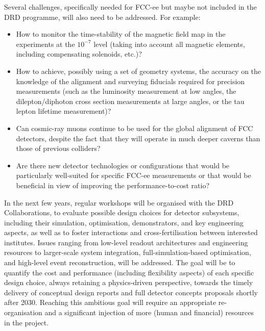 Several challenges, specifically needed for FCC-ee but maybe not included in the DRD programme, will also need to be addressed. 
For example:
\begin{itemize}
\item How to monitor the time-stability of the magnetic field map in the experiments at the $10^{-7}$ level 
(taking into account all magnetic elements, including compensating solenoids, etc.)?
\item How to achieve, possibly using a set of geometry systems, 
the accuracy on the knowledge of the alignment and surveying fiducials required for precision measurements 
(such as the luminosity measurement at low angles, the dilepton/diphoton cross section measurements at large angles, 
or the tau lepton lifetime measurement)?
\item Can cosmic-ray muons continue to be used for the global alignment of FCC detectors, 
despite the fact that they will operate in much deeper caverns than those of previous colliders?
\item Are there new detector technologies or configurations that would be particularly well-suited for specific FCC-ee measurements 
or that would be beneficial in view of improving the performance-to-cost ratio?
\end{itemize}

In the next few years, regular workshops will be organised with the DRD Collaborations, 
to evaluate possible design choices for detector subsystems, 
including their simulation, optimisation, demonstrators, and key engineering aspects, 
as well as to foster interactions and cross-fertilisation between interested institutes. 
Issues ranging from low-level readout architectures and engineering resources 
to larger-scale system integration, full-simulation-based optimisation, and high-level event reconstruction, 
will be addressed.
The goal will be to quantify the cost and performance (including flexibility aspects) of each specific design choice, 
always retaining a physics-driven perspective,
towards the timely delivery of conceptual design reports and full detector concepts proposals shortly after 2030. 
Reaching this ambitious goal will require an appropriate re-organisation 
and a significant injection of more (human and financial) resources in the project.